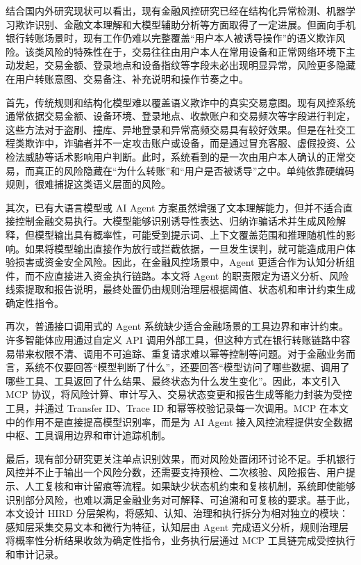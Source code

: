 \documentclass{xduugthesis}
\begin{document}
结合国内外研究现状可以看出，现有金融风控研究已经在结构化异常检测、机器学习欺诈识别、金融文本理解和大模型辅助分析等方面取得了一定进展。但面向手机银行转账场景时，现有工作仍难以完整覆盖“用户本人被诱导操作”的语义欺诈风险。该类风险的特殊性在于，交易往往由用户本人在常用设备和正常网络环境下主动发起，交易金额、登录地点和设备指纹等字段未必出现明显异常，风险更多隐藏在用户转账意图、交易备注、补充说明和操作节奏之中。

首先，传统规则和结构化模型难以覆盖语义欺诈中的真实交易意图。现有风控系统通常依据交易金额、设备环境、登录地点、收款账户和交易频次等字段进行判定，这些方法对于盗刷、撞库、异地登录和异常高频交易具有较好效果。但是在社交工程类欺诈中，诈骗者并不一定攻击账户或设备，而是通过冒充客服、虚假投资、公检法威胁等话术影响用户判断。此时，系统看到的是一次由用户本人确认的正常交易，而真正的风险隐藏在“为什么转账”和“用户是否被诱导”之中。单纯依靠硬编码规则，很难捕捉这类语义层面的风险\cite{nicolaou2025llm}。

其次，已有大语言模型或 AI Agent 方案虽然增强了文本理解能力，但并不适合直接控制金融交易执行。大模型能够识别诱导性表达、归纳诈骗话术并生成风险解释，但模型输出具有概率性，可能受到提示词、上下文覆盖范围和推理随机性的影响。如果将模型输出直接作为放行或拦截依据，一旦发生误判，就可能造成用户体验损害或资金安全风险。因此，在金融风控场景中，Agent 更适合作为认知分析组件，而不应直接进入资金执行链路。本文将 Agent 的职责限定为语义分析、风险线索提取和报告说明，最终处置仍由规则治理层根据阈值、状态机和审计约束生成确定性指令。

再次，普通接口调用式的 Agent 系统缺少适合金融场景的工具边界和审计约束。许多智能体应用通过自定义 API 调用外部工具，但这种方式在银行转账链路中容易带来权限不清、调用不可追踪、重复请求难以幂等控制等问题。对于金融业务而言，系统不仅要回答“模型判断了什么”，还要回答“模型访问了哪些数据、调用了哪些工具、工具返回了什么结果、最终状态为什么发生变化”。因此，本文引入 MCP 协议，将风险计算、审计写入、交易状态变更和报告生成等能力封装为受控工具，并通过 Transfer ID、Trace ID 和幂等校验记录每一次调用。MCP 在本文中的作用不是直接提高模型识别率，而是为 AI Agent 接入风控流程提供安全数据中枢、工具调用边界和审计追踪机制\cite{anthropic2024mcp}。

最后，现有部分研究更关注单点识别效果，而对风险处置闭环讨论不足。手机银行风控并不止于输出一个风险分数，还需要支持预检、二次核验、风险报告、用户提示、人工复核和审计留痕等流程。如果缺少状态机约束和复核机制，系统即使能够识别部分风险，也难以满足金融业务对可解释、可追溯和可复核的要求。基于此，本文设计 HIRD 分层架构，将感知、认知、治理和执行拆分为相对独立的模块：感知层采集交易文本和微行为特征，认知层由 Agent 完成语义分析，规则治理层将概率性分析结果收敛为确定性指令，业务执行层通过 MCP 工具链完成受控执行和审计记录。
\end{document}
